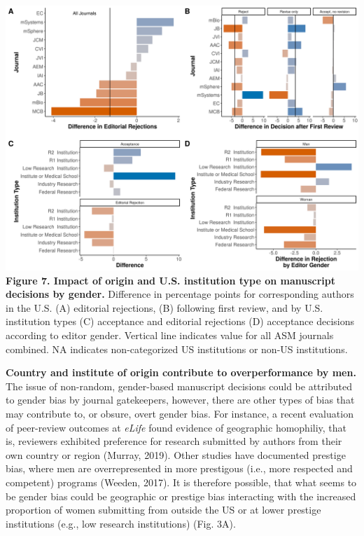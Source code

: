 \documentclass[11pt,]{article}
\begin{document}
\includegraphics{Figure_7.png} \textbf{Figure 7. Impact of origin and
U.S. institution type on manuscript decisions by gender.} Difference in
percentage points for corresponding authors in the U.S. (A) editorial
rejections, (B) following first review, and by U.S. institution types
(C) acceptance and editorial rejections (D) acceptance decisions
according to editor gender. Vertical line indicates value for all ASM
journals combined. NA indicates non-categorized US institutions or
non-US institutions.

\textbf{Country and institute of origin contribute to overperformance by
men.} The issue of non-random, gender-based manuscript decisions could
be attributed to gender bias by journal gatekeepers, however, there are
other types of bias that may contribute to, or obsure, overt gender
bias. For instance, a recent evaluation of peer-review outcomes at
\emph{eLife} found evidence of geographic homophiliy, that is, reviewers
exhibited preference for research submitted by authors from their own
country or region (Murray, 2019). Other studies have documented prestige
bias, where men are overrepresented in more prestigous (i.e., more
respected and competent) programs (Weeden, 2017). It is therefore
possible, that what seems to be gender bias could be geographic or
prestige bias interacting with the increased proportion of women
submitting from outside the US or at lower prestige institutions (e.g.,
low research institutions) (Fig. 3A).
\end{document}
